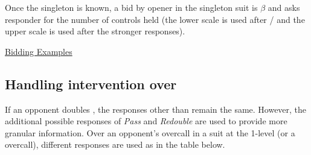 \documentclass[a4paper,article,oneside]{memoir}
\newcommand{\vtwo}[1]{{\color{v2color}#1}}
\begin{document}
\vtwo{
  Once the singleton is known, a bid by opener in the singleton
  suit is $\beta$ and asks responder for the number of controls held
  (the lower scale is used after \cl{3}/\di{} and the upper scale is
  used after the stronger
  responses).\hyperlink{controlask}{\HandCuffRight}

\hyperlink{ex1c3c}{Bidding Examples}
}

\subsection{Handling intervention over }

If an opponent doubles , the responses other than  remain
the same. However, the additional possible responses of \emph{Pass}
and \emph{Redouble} are used to provide more granular
information. Over an opponent's overcall in a suit at the 1-level (or
a  overcall), different responses are used as in the table
below.
\end{document}
